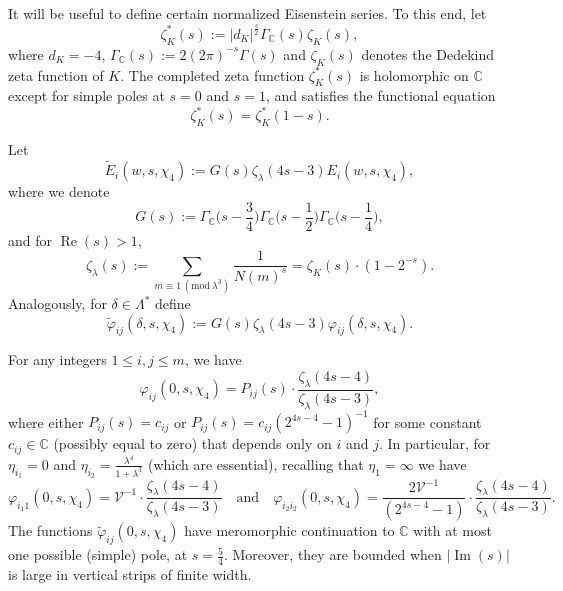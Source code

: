 \documentclass[12pt,reqno]{amsart}
\numberwithin{equation}{section}
\renewcommand{\Im}{\operatorname{Im}}
\renewcommand{\Re}{\operatorname{Re}}
\renewcommand{\pmod}[1]{\, (\mathrm{mod}\ #1)}
\newcommand{\C}{\mathbb{C}}
\begin{document}
It will be useful to define certain normalized Eisenstein series. To this end, let
\begin{equation*} 
    \zeta^{*}_{K}(s):=|d_K|^{\frac{s}{2}} \Gamma_\C(s) \zeta_{K}(s),
\end{equation*}
where $d_K = -4$, $\Gamma_\C(s) := 2(2 \pi)^{-s} \Gamma(s)$ and $\zeta_{K}(s)$ denotes the Dedekind zeta function of $K$. The completed zeta function $\zeta^{*}_{K}(s)$ is holomorphic on $\mathbb{C}$ except for simple poles at $s=0$ and $s=1$, and satisfies the functional equation
\begin{equation} \label{zetafunc}
    \zeta^{*}_{K}(s)=\zeta^{*}_{K}(1-s).
\end{equation}

Let
\begin{equation} \label{fancyE}
    \widetilde{E}_{i}(w,s,\chi_4):= G(s) \zeta_{\lambda} (4s -3) E_{i}(w,s,\chi_4), 
\end{equation}
where we denote
\begin{equation*}
    G(s):= \Gamma_\C \Big(s-\frac{3}{4} \Big )  \Gamma_\C \Big(s-\frac{1}{2} \Big)  \Gamma_\C \Big(s-\frac{1}{4} \Big),
\end{equation*}
and for $\Re(s)>1$,
\begin{equation*}
    \zeta_{\lambda}(s) := \sum_{m \equiv 1 \pmod{\lambda^{3}}} \frac{1}{N(m)^s} = \zeta_K(s) \cdot (1-2^{-s}).
\end{equation*}
Analogously, for $\delta \in \Lambda^{*}$ define 
\begin{equation}\label{rhotilde}
    \widetilde{\varphi}_{ij}(\delta,s,\chi_4) := G(s) \zeta_{\lambda} (4s -3) \varphi_{ij}(\delta,s,\chi_4).
\end{equation}

\begin{lemma} \label{scatter}
    For any integers $1 \leq i, j\leq m$, we have
    \begin{equation} \label{varphigenell}
        \varphi_{ij}(0,s,\chi_4) = P_{ij}(s) \cdot \frac{\zeta_{\lambda}(4s-4)}{\zeta_{\lambda}(4s-3)},
    \end{equation} 
    where either $P_{ij}(s) = c_{ij}$ or $P_{ij}(s) = c_{ij}(2^{4s-4}-1)^{-1}$ for some constant $c_{ij} \in \C$ (possibly equal to zero) that depends only on $i$ and $j$. In particular, for $\eta_{i_1} = 0$ and $\eta_{i_2} = \frac{\lambda^4}{1+\lambda^3}$ (which are essential), recalling that $\eta_1 = \infty$ we have 
    \begin{equation} \label{zeroinfty}
        \varphi_{i_1 1}(0,s,\chi_4)=\mathcal{V}^{-1} \cdot \frac{\zeta_{\lambda}(4s-4)}{\zeta_{\lambda}(4s-3)} \quad \text{and} \quad \varphi_{i_2 i_2}(0,s,\chi_4) = \frac{2 \mathcal{V}^{-1}}{(2^{4s-4} - 1)}\cdot  \frac{\zeta_{\lambda}(4s-4)}{\zeta_{\lambda}(4s-3)}.
    \end{equation}
    The functions $\widetilde{\varphi}_{ij}(0, s, \chi_4)$ have meromorphic continuation to $\C$ with at most one possible (simple) pole, at $s = \frac{5}{4}$. Moreover, they are bounded when $|\Im(s)|$ is large in vertical strips of finite width.
\end{lemma}
\end{document}
